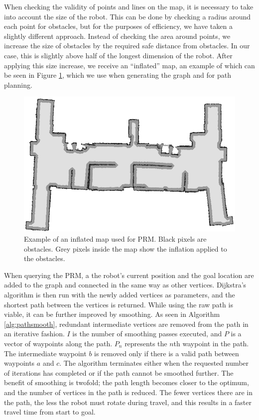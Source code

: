 \documentclass[conference]{IEEEtran}
\begin{document}
When checking the validity of points and lines on the map, it is necessary to take into account the size of the robot. This can be done by checking a radius around each point for obstacles, but for the purposes of efficiency, we have taken a slightly different approach. Instead of checking the area around points, we increase the size of obstacles by the required safe distance from obstacles. In our case, this is slightly above half of the longest dimension of the robot. After applying this size increase, we receive an ``inflated'' map, an example of which can be seen in Figure \ref{fig:inflatedmap}, which we use when generating the graph and for path planning.
\begin{figure}[h]
  \centering
  \includegraphics[width=\columnwidth]{inflated}
  \caption{Example of an inflated map used for PRM. Black pixels are obstacles. Grey pixels inside the map show the inflation applied to the obstacles.}
  \label{fig:inflatedmap}
\end{figure}
When querying the PRM, a the robot's current position and the goal location are added to the graph and connected in the same way as other vertices. Dijkstra's algorithm is then run with the newly added vertices as parameters, and the shortest path between the vertices is returned. While using the raw path is viable, it can be further improved by smoothing. As seen in Algorithm \ref{alg:pathsmooth}, redundant intermediate vertices are removed from the path in an iterative fashion. $I$ is the number of smoothing passes executed, and $P$ is a vector of waypoints along the path. $P_n$ represents the $n$th waypoint in the path. The intermediate waypoint $b$ is removed only if there is a valid path between waypoints $a$ and $c$. The algorithm terminates either when the requested number of iterations has completed or if the path cannot be smoothed further. The benefit of smoothing is twofold; the path length becomes closer to the optimum, and the number of vertices in the path is reduced. The fewer vertices there are in the path, the less the robot must rotate during travel, and this results in a faster travel time from start to goal.
\end{document}

